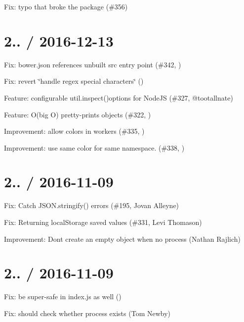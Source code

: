 \begin{DoxyItemize}
\item Fix\+: typo that broke the package (\#356)
\end{DoxyItemize}

\section*{2.. / 2016-\/12-\/13 }


\begin{DoxyItemize}
\item Fix\+: bower.\+json references unbuilt src entry point (\#342, )
\item Fix\+: revert \char`\"{}handle regex special characters\char`\"{} ()
\item Feature\+: configurable util.\+inspect(){\ttfamily options for Node\+JS (\#327, @tootallnate)}
\item {\ttfamily Feature\+: O}(big O) pretty-\/prints objects (\#322, )
\item Improvement\+: allow colors in workers (\#335, )
\item Improvement\+: use same color for same namespace. (\#338, )
\end{DoxyItemize}

\section*{2.. / 2016-\/11-\/09 }


\begin{DoxyItemize}
\item Fix\+: Catch {\ttfamily J\+S\+O\+N.\+stringify()} errors (\#195, Jovan Alleyne)
\item Fix\+: Returning {\ttfamily local\+Storage} saved values (\#331, Levi Thomason)
\item Improvement\+: Don\textquotesingle{}t create an empty object when no {\ttfamily process} (Nathan Rajlich)
\end{DoxyItemize}

\section*{2.. / 2016-\/11-\/09 }


\begin{DoxyItemize}
\item Fix\+: be super-\/safe in index.\+js as well ()
\item Fix\+: should check whether process exists (Tom Newby)
\end{DoxyItemize}

